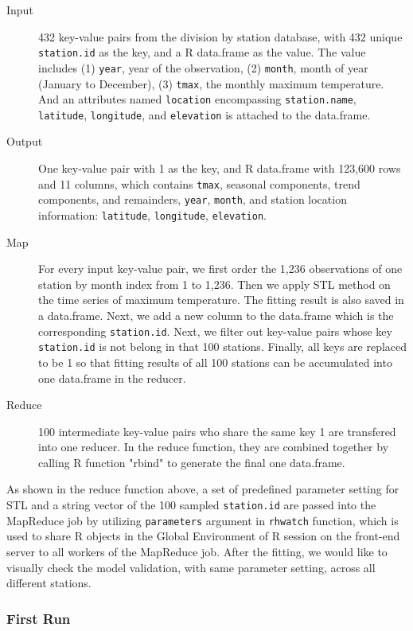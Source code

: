 \begin{description}
  \item[Input] 432 key-value pairs from the division by station database, with 432 
  unique \texttt{station.id} as the key, and a R data.frame as the value. The value 
  includes (1) \texttt{year}, year of the observation, (2) \texttt{month}, month 
  of year (January to December), (3) \texttt{tmax}, the monthly maximum temperature.
  And an attributes named \texttt{location} encompassing \texttt{station.name},
  \texttt{latitude}, \texttt{longitude}, and \texttt{elevation} is attached to the
  data.frame.
  \item[Output] One key-value pair with 1 as the key, and R data.frame with 123,600
  rows and 11 columns, which contains \texttt{tmax}, seasonal components, trend 
  components, and remainders, \texttt{year}, \texttt{month}, and station location 
  information: \texttt{latitude}, \texttt{longitude}, \texttt{elevation}. 
  \item[Map]For every input key-value pair, we first order the 1,236 observations 
  of one station by month index from 1 to 1,236. Then we apply STL method on the 
  time series of maximum temperature. The fitting result is also saved in a 
  data.frame. Next, we add a new column to the data.frame which is the corresponding 
  \texttt{station.id}. Next, we filter out key-value pairs whose key 
  \texttt{station.id} is not belong in that 100 stations. Finally, all keys are 
  replaced to be 1 so that fitting results of all 100 stations can be accumulated 
  into one data.frame in the reducer. \item[Reduce] 100 intermediate key-value 
  pairs who share the same key 1 are transfered into one reducer. In the reduce 
  function, they are combined together by calling R function "rbind" to generate 
  the final one data.frame. 
\end{description}

As shown in the reduce function above, a set of predefined parameter setting for 
STL and a string vector of the 100 sampled \texttt{station.id} are passed into 
the MapReduce job by utilizing \texttt{parameters} argument in \texttt{rhwatch} 
function, which is used to share R objects in the Global Environment of R session 
on the front-end server to all workers of the MapReduce job. After the fitting, 
we would like to visually check the model validation, with same parameter setting, 
across all different stations.

\subsubsection{First Run}

